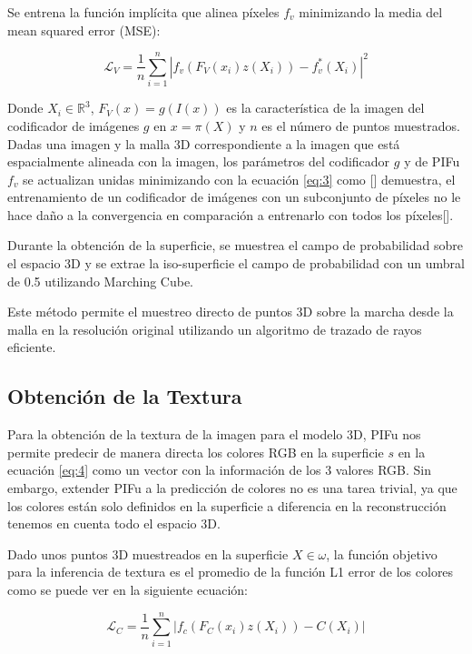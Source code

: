 Se entrena la función implícita que alinea píxeles $f_{v}$ minimizando la media del mean squared error (MSE):

\begin{equation}
	\label{eq:3}
	\mathcal{L}_{V} = \frac{1}{n} 
	\sum_{i=1}^{n} | f_{v} (F_{V}(x_{i}) z(X_{i})) - f_{v}^{*}(X_{i}) |^{2}
\end{equation}

Donde $X_{i} \in \mathbb{R}^{3}$, $F_{V}(x) = g(I(x))$ es la característica de la imagen del codificador de imágenes $g$ en $x = \pi(X)$ y $n$ es el número de puntos muestrados. Dadas una imagen y la malla 3D correspondiente a la imagen que está espacialmente alineada con la imagen, los parámetros del codificador $g$ y de PIFu $f_{v}$ se actualizan unidas minimizando con la ecuación \ref{eq:3} como [\cite{eq3}] demuestra, el entrenamiento de un codificador de imágenes con un subconjunto de píxeles no le hace daño a la convergencia en comparación a entrenarlo con todos los píxeles[\cite{pifu}]. 

Durante la obtención de la superficie, se muestrea el campo de probabilidad sobre el espacio 3D y se extrae la iso-superficie el campo de probabilidad con un umbral de 0.5 utilizando Marching Cube. 

Este método permite el muestreo directo de puntos 3D sobre la marcha desde la malla en la resolución original utilizando un algoritmo de trazado de rayos eficiente.

\subsection{Obtención de la Textura}
Para la obtención de la textura de la imagen para el modelo 3D, PIFu nos permite predecir de manera directa los colores RGB en la superficie $s$ en la ecuación \ref{eq:4} como un vector con la información de los 3 valores RGB. Sin embargo, extender PIFu a la predicción de colores no es una tarea trivial, ya que los colores están solo definidos en la superficie a diferencia en la reconstrucción tenemos en cuenta todo el espacio 3D. 

Dado unos puntos 3D muestreados en la superficie $X \in \omega$, la función objetivo para la inferencia de textura es el promedio de la función L1 error de los colores como se puede ver en la siguiente ecuación:

\begin{equation}
	\label{eq:4}
	\mathcal{L}_{C} = \frac{1}{n} 
	\sum_{i=1}^{n} | f_{c} (F_{C}(x_{i}) z(X_{i})) - C(X_{i}) |
\end{equation}

